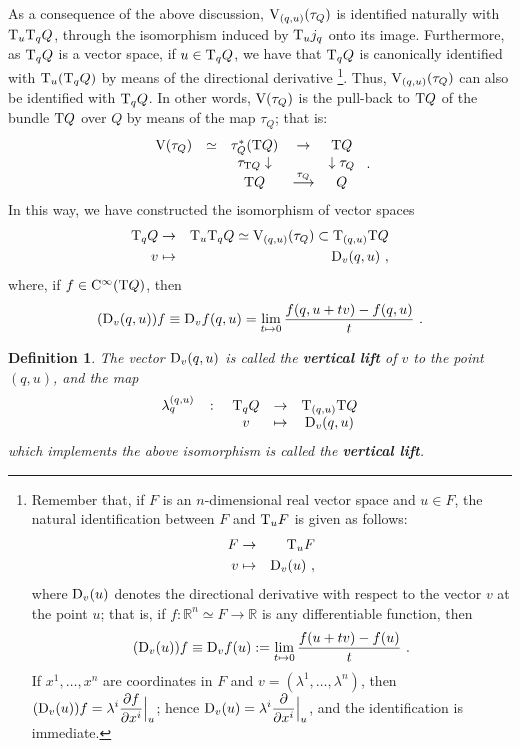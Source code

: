 \documentclass[12pt]{report}
\newtheorem{definition}[teor]{Definition}
\def\dst{\displaystyle}
\def\derpar#1#2{\frac{\partial{#1}}{\partial{#2}}}
\def\mapping#1{\mathrel{\mathop{\longrightarrow}\limits^{#1}}}
\def\Real{\mathbb{R}}
\def\Tan{{\rm T}}
\def\Cinfty{{\rm C}^\infty}
\begin{document}
As a consequence of the above discussion, ${\rm V}_{(q,u)}(\tau_Q)$
is identified naturally with $\Tan_u\Tan_qQ$,
through the isomorphism induced by $\Tan_uj_q$ onto its image.
Furthermore, as $\Tan_qQ$ is a vector space,
if $u \in \Tan_qQ$, we have that $\Tan_qQ$
is canonically identified with $\Tan_u(\Tan_qQ)$ by means of the directional derivative
\footnote{
Remember that, if $F$ is an $n$-dimensional real vector space and
$u \in F$, the natural identification between $F$ and $\Tan_uF$
is given as follows:
\begin{eqnarray*}
F & \to & \Tan_uF
\\
v & \mapsto & {\rm D}_v(u) \ ,
\end{eqnarray*}
where ${\rm D}_v(u)$ denotes the directional derivative with respect to the vector $v$ at the point $u$;
that is, if $f \colon \Real^n\simeq F\to \Real$ is any differentiable function, then
$$
({\rm D}_v(u))f\equiv{\rm D}_vf(u):= \lim_{t \mapsto 0}\frac{f(u+tv)-f(u)}{t} \ .
$$
If $x^1,\ldots ,x^n$ are coordinates in $F$ and
$v=(\lambda^1,\ldots ,\lambda^n)$, then
\(\dst ({\rm D}_v(u))f=\lambda^i\derpar{f}{x^i}\Big\vert_u\);
hence
\(\dst {\rm D}_v(u)=\lambda^i\derpar{}{x^i}\Big\vert_u\),
and the identification is immediate.
}.
Thus, ${\rm V}_{(q,u)}(\tau_Q)$ can also be identified with
 $\Tan_qQ$.
In other words,
${\rm V}(\tau_Q)$ is the pull-back to $\Tan Q$ of the bundle
$\Tan Q$ over $Q$ by means of the map $\tau_Q$;
that is:
$$
\begin{array}{ccccc}
{\rm V}(\tau_Q) & \simeq &\tau_Q^*(\Tan Q)& \to & \Tan Q
\\
& & \tau_{\Tan Q} \downarrow &  & \downarrow \tau_Q
\\
& & \Tan Q& \mapping{\tau_Q} & Q
\end{array} \ .
$$
In this way, we have constructed the  isomorphism of vector spaces
\begin{eqnarray*}
\Tan_qQ & \to & \Tan_u\Tan_q Q\simeq{\rm V}_{(q,u)}(\tau_Q)\subset\Tan_{(q,u)}\Tan Q
\\
v & \mapsto & {\rm D}_v(q,u) \ ,
\end{eqnarray*}
where, if $f \in\Cinfty (\Tan Q)$, then
$$
({\rm D}_v(q,u))f\equiv{\rm D}_vf(q,u)=\lim_{t \mapsto 0}\frac{f(q,u+tv)-f(q,u)}{t} \ .
$$

\begin{definition}
The vector ${\rm D}_v(q,u)$ is called the
\textbf{vertical lift} of $v$ to the point $(q,u)$,
and the map
$$
\begin{array}{ccccc}
\lambda_q^{(q,u)} & \colon &\Tan_qQ & \to & \Tan_{(q,u)}\Tan Q
\\
& & v & \mapsto & {\rm D}_v(q,u)
\end{array}
$$
which implements the above isomorphism is called the
\textbf{vertical lift}.
\end{definition}
\end{document}
